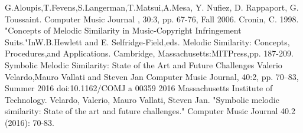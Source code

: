 \documentclass{article}
\begin{document}
	\begin{thebibliography}{9}
		G.Aloupis,T.Fevens,S.Langerman,T.Matsui,A.Mesa, Y. Nufiez, D. Rappaport, G. Toussaint. Computer Music Journal , 30:3, pp. 67-76, Fall 2006.
		Cronin, C. 1998. "Concepts of Melodic Similarity in
		Music-Copyright Infringement Suits."InW.B.Hewlett and E. Selfridge-Field,eds. Melodic Similarity: Concepts, Procedures,and Applications. Cambridge, Massachusetts:MITPress,pp. 187-209.
		Symbolic Melodic Similarity: State of the Art and Future Challenges
		Valerio Velardo,Mauro Vallati and Steven Jan
		Computer Music Journal, 40:2, pp. 70–83, Summer 2016 doi:10.1162/COMJ a 00359
		2016 Massachusetts Institute of Technology.
		Velardo, Valerio, Mauro Vallati, Steven Jan.
		"Symbolic melodic similarity: State of the art and future challenges." Computer Music Journal 40.2 (2016): 70-83.

	\end{thebibliography}
\end{document}

